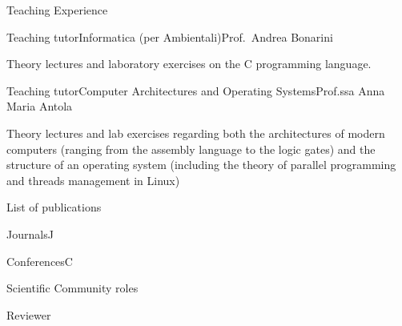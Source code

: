 \documentclass[
	a4paper, %
	11pt, %
]{resume} %
\begin{document}
\begin{rSection}{Teaching Experience}
\begin{rSubsection}{Teaching tutor}{}{Informatica (per Ambientali)}{Prof.\ Andrea Bonarini}
\item Theory lectures and laboratory exercises on the C programming language.
\end{rSubsection}
\begin{rSubsection}{Teaching tutor}{}{Computer Architectures and Operating Systems}{Prof.ssa Anna Maria Antola}
\item Theory lectures and lab exercises regarding both the architectures of
  modern computers (ranging from the assembly language to the logic gates) and
  the structure of an operating system (including the theory of parallel
  programming and threads management in Linux)
\end{rSubsection}
\end{rSection}
\clearpage
\begin{rSection}{List of publications}
  \begin{tSubPublications}{Journals}{J}
  \item {}
  \end{tSubPublications}
  \begin{tSubPublications}{Conferences}{C}
  \item {}
  \item {}
  \end{tSubPublications}
\end{rSection}
\begin{rSection}{Scientific Community roles}
  \begin{rSubsection}{Reviewer}{}{}{}
  \item {}
  \item {}
  \item {}
  \end{rSubsection}
\end{rSection}
\end{document}
